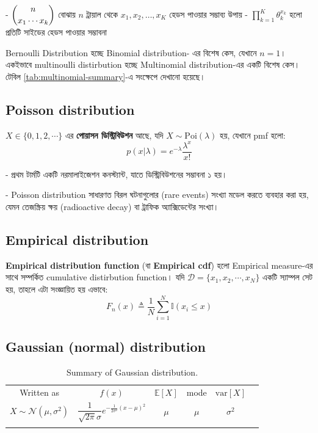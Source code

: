 \documentclass[graybox, envcountchap, twocolumn]{styles/svmult}
\begin{document}
- $\dbinom{n}{x_1 \cdots x_k}$ বোঝায় $n$ ট্রায়াল থেকে $x_1, x_2, \dots, x_K$ হেডস পাওয়ার সম্ভাব্য উপায় 
- $\prod\limits_{k=1}^K\theta_k^{x_k}$ হলো প্রতিটি সাইডের হেডস পাওয়ার সম্ভাবনা

Bernoulli Distribution হচ্ছে Binomial distribution- এর বিশেষ কেস, যেখানে $n=1$। একইভাবে multinoulli distirbution হচ্ছে Multinomial  distribution-এর একটি বিশেষ কেস। টেবিল \ref{tab:multinomial-summary}-এ সংক্ষেপে দেখানো হয়েছে।

\subsection{ Poisson distribution}
\begin{definition}
$X \in \{0,1,2,\cdots\}$ এর \textbf{পোয়াসন ডিস্ট্রিবিউশন} আছে, যদি $X \sim \text{Poi}(\lambda)$ হয়, যেখানে pmf হলো:
\begin{equation}
p(x|\lambda)=e^{-\lambda}\dfrac{\lambda^x}{x!}
\end{equation}
\end{definition}

-   প্রথম টার্মটি একটি নরমালাইজেশন কনস্ট্যান্ট, যাতে ডিস্ট্রিবিউশনের সম্ভাবনা ১ হয়।

-   Poisson distribution সাধারণত বিরল ঘটনাগুলোর (rare events) সংখ্যা মডেল করতে ব্যবহার করা হয়, যেমন তেজস্ক্রিয় ক্ষয় (radioactive decay) বা ট্রাফিক অ্যাক্সিডেন্টের সংখ্যা।

\subsection{Empirical distribution}
\textbf{Empirical distribution function} (বা \textbf{Empirical cdf}) হলো Empirical measure-এর সাথে সম্পর্কিত cumulative distirbution function। যদি $\mathcal{D}=\{x_1,x_2,\cdots,x_N\}$ একটি স্যাম্পল সেট হয়, তাহলে এটা সংজ্ঞায়িত হয় এভাবে:
\begin{equation}
F_n(x) \triangleq \dfrac{1}{N}\sum\limits_{i=1}^N\mathbb{I}(x_i \leq x)
\end{equation}




\subsection{Gaussian (normal) distribution}



\begin{table}
\caption{Summary of Gaussian distribution.}
\centering
\begin{tabular}{cccccc}
\hline\noalign{\smallskip}
Written as & $f(x)$ & $\mathbb{E}[X]$ & mode & $\text{var}[X]$ \\
\noalign{\smallskip}\svhline\noalign{\smallskip}
$X \sim \mathcal{N}(\mu,\sigma^2)$ & $\dfrac{1}{\sqrt{2\pi}\sigma}e^{-\frac{1}{2\sigma^2}\left(x-\mu\right)^2}$ & $\mu$ & $\mu$ & $\sigma^2$ \\
\noalign{\smallskip}\hline
\end{tabular}
\end{table} 
\end{document}
